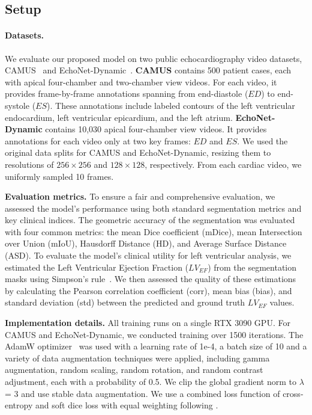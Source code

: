 \subsection{Setup}
    \label{subsec:setup}
\paragraph{Datasets.}
    \label{para:datasets}
We evaluate our proposed model on two public echocardiography video datasets, CAMUS~\cite{leclerc2019deep} and EchoNet-Dynamic~\cite{ouyang2019echonet}. 
\textbf{CAMUS} contains 500 patient cases, each with apical four-chamber and two-chamber view videos. For each video, it provides frame-by-frame annotations spanning from end-diastole ($ED$) to end-systole ($ES$). These annotations include labeled contours of the left ventricular endocardium, left ventricular epicardium, and the left atrium. 
\textbf{EchoNet-Dynamic} contains 10,030 apical four-chamber view videos. It provides annotations for each video only at two key frames: $ED$ and $ES$. 
We used the original data splits for CAMUS and EchoNet-Dynamic, resizing them to resolutions of $256 \times 256$ and $128 \times 128$, respectively. From each cardiac video, we uniformly sampled 10 frames.

\noindent
\textbf{Evaluation metrics.}
    \label{para:eval}
To ensure a fair and comprehensive evaluation, we assessed the model's performance using both standard segmentation metrics and key clinical indices. The geometric accuracy of the segmentation was evaluated with four common metrics: the mean Dice coefficient (mDice), mean Intersection over Union (mIoU), Hausdorff Distance (HD), and Average Surface Distance (ASD). 
To evaluate the model's clinical utility for left ventricular analysis, we estimated the Left Ventricular Ejection Fraction ($LV_{EF}$) from the segmentation masks using Simpson's rule~\cite{LANG20151}. We then assessed the quality of these estimations by calculating the Pearson correlation coefficient (corr), mean bias (bias), and standard deviation (std) between the predicted and ground truth $LV_{EF}$ values.

\noindent
\textbf{Implementation details.}
    \label{para:imp}
All training runs on a single RTX 3090 GPU. 
For CAMUS and EchoNet-Dynamic, we conducted training over 1500 iterations. 
The AdamW optimizer~\cite{loshchilov2019decoupledweightdecayregularization} was used with a learning rate of 1e-4, a batch size of 10 and a variety of data augmentation techniques were applied, including gamma augmentation, random scaling, random rotation, and random contrast adjustment, each with a probability of 0.5. We clip the global gradient norm to $\lambda$ = 3 and use stable data augmentation. 
We use a combined loss function of cross-entropy and soft dice loss with equal weighting following \citet{cheng2024puttingobjectvideoobject}.